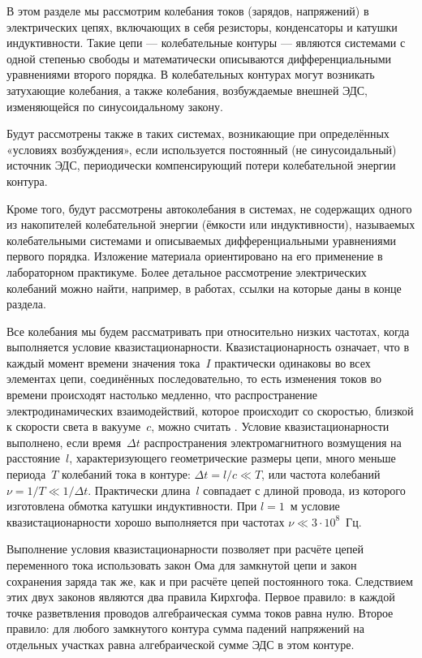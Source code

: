 \documentclass[a4paper,oneside]{book}
\begin{document}

В этом разделе мы рассмотрим колебания токов (зарядов, напряжений) в электрических цепях, включающих в себя резисторы, конденсаторы и катушки индуктивности. Такие цепи --- колебательные контуры --- являются системами с одной степенью свободы и математически описываются дифференциальными уравнениями второго порядка. В колебательных контурах могут возникать  затухающие колебания, а также  колебания, возбуждаемые внешней ЭДС, изменяющейся по синусоидальному закону.

Будут рассмотрены также  в таких системах, возникающие при определённых «условиях возбуждения», если используется постоянный (не синусоидальный) источник ЭДС, периодически компенсирующий потери колебательной энергии контура.

Кроме того, будут рассмотрены автоколебания в системах, не содержащих одного из накопителей колебательной энергии (ёмкости или индуктивности), называемых  колебательными системами и описываемых дифференциальными уравнениями первого порядка.
Изложение материала ориентировано на его применение в лабораторном практикуме. Более детальное рассмотрение электрических колебаний можно найти, например, в работах, ссылки на которые даны в конце раздела.

Все колебания мы будем рассматривать при относительно низких частотах, когда
выполняется условие квазистационарности. Квазистационарность означает, что в
каждый момент времени значения тока~$I$ практически одинаковы во всех элементах
цепи, соединённых последовательно, то есть изменения токов во времени происходят
настолько медленно, что распространение электродинамических взаимодействий,
которое происходит со скоростью, близкой к скорости света в вакууме~$c$, можно
считать . Условие квазистационарности выполнено, если
время~$\Delta t$ распространения электромагнитного возмущения на расстояние~$l$,
характеризующего геометрические размеры цепи, много меньше периода~$T$ колебаний
тока в контуре: $\Delta t=l/c\ll T$, или частота колебаний $\nu=1/T\ll1/\Delta
t$. Практически длина~$l$ совпадает с длиной провода, из которого изготовлена
обмотка катушки индуктивности. При $l=1$~м условие квазистационарности хорошо
выполняется при частотах $\nu\ll3\cdot10^8$~Гц.

Выполнение условия квазистационарности позволяет при расчёте цепей переменного
тока использовать закон Ома для замкнутой цепи и закон сохранения заряда так же,
как и при расчёте цепей постоянного тока. Следствием этих двух законов являются
два правила Кирхгофа. Первое правило: в каждой точке разветвления проводов
алгебраическая сумма токов равна нулю. Второе правило: для любого замкнутого
контура сумма падений напряжений на отдельных участках равна алгебраической
сумме ЭДС в этом контуре.
\end{document}
